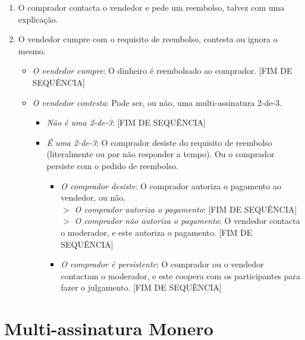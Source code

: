 \begin{enumerate}
\begin{itemize}
        \begin{enumerate}
            \item O comprador contacta o vendedor e pede um reembolso, talvez com uma explicação.
            \item O vendedor cumpre com o requisito de reembolso, contesta ou ignora o mesmo.
            \begin{itemize}
                \item {\em O vendedor cumpre}: O dinheiro é reembolsado ao comprador. [FIM DE SEQUÊNCIA]
                \item {\em O vendedor contesta}: Pode ser, ou não, uma multi-assinatura 2-de-3.
                \begin{itemize}
                    \item {\em Não é uma 2-de-3}: [FIM DE SEQUÊNCIA]
                    \item {\em É uma 2-de-3}: O comprador desiste do requisito de reembolso (literalmente ou por não responder a tempo). Ou o comprador persiste com o pedido de reembolso. 
                    \begin{itemize}
                        \item {\em O comprador desiste}: O comprador autoriza o pagamento ao vendedor, ou não.\\
                        $>$ {\em O comprador autoriza o pagamento}: [FIM DE SEQUÊNCIA]\\
                        $>$ {\em O comprador não autoriza o pagamento}: O vendedor contacta o moderador, e este autoriza o pagamento. [FIM DE SEQUÊNCIA]
                        \item {\em O comprador é persistente}: O comprador ou o vendedor contactam o moderador, e este coopera com os participantes para fazer o julgamento. [FIM DE SEQUÊNCIA]
                    \end{itemize}{}
                \end{itemize}
            \end{itemize}{}
        \end{enumerate}{}
    \end{itemize}{}
\end{enumerate}{}

\fi

\section{Multi-assinatura Monero}
\label{sec:escrowed-marketplace-seamless-multisig}

